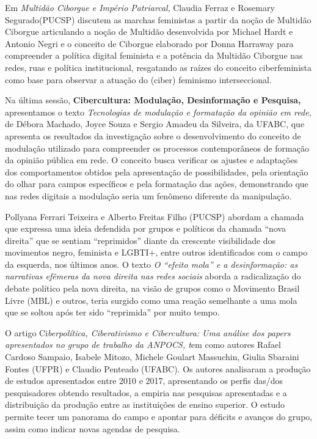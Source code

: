 Em \emph{Multidão Ciborgue e Império Patriarcal}, Claudia Ferraz e
Rosemary Segurado(PUCSP) discutem as marchas feministas a partir da
noção de Multidão Ciborgue articulando a noção de Multidão desenvolvida
por Michael Hardt e Antonio Negri e o conceito de Ciborgue elaborado por
Donna Harraway para compreender a política digital feminista e a
potência da Multidão Ciborgue nas redes, ruas e política institucional,
resgatando as raízes do conceito ciberfeminista como base para observar
a atuação do (ciber) feminismo interseccional.

Na última sessão, \textbf{Cibercultura: Modulação, Desinformação e
Pesquisa,} apresentamos o texto \emph{Tecnologias de modulação e
formatação da opinião em rede,} de Débora Machado, Joyce Souza e Sergio
Amadeu da Silveira, da UFABC, que apresenta os resultados da
investigação sobre o desenvolvimento do conceito de modulação utilizado
para compreender os processos contemporâneos de formação da opinião
pública em rede. O conceito busca verificar os ajustes e adaptações dos
comportamentos obtidos pela apresentação de possibilidades, pela
orientação do olhar para campos específicos e pela formatação das ações,
demonstrando que nas redes digitais a modulação seria um fenômeno
diferente da manipulação.

Pollyana Ferrari Teixeira e Alberto Freitas Filho (PUCSP) abordam a
chamada que expressa uma ideia defendida por grupos e políticos da
chamada ``nova direita'' que se sentiam ``reprimidos'' diante da
crescente visibilidade dos movimentos negro, feminista e LGBTI+, entre
outros identificados com o campo da esquerda, nos últimos anos. O texto
\emph{O ``efeito mola'' e a desinformação: as narrativas efêmeras da
nova direita nas redes sociais} aborda a radicalização do debate
político pela nova direita, na visão de grupos como o Movimento Brasil
Livre (MBL) e outros, teria surgido como uma reação semelhante a uma
mola que se soltou após ter sido ``reprimida'' por muito tempo.

O artigo Ci\emph{berpolítica, Ciberativismo e Cibercultura: Uma análise
dos papers apresentados no grupo de trabalho da ANPOCS, t}em como
autores Rafael Cardoso Sampaio, Isabele Mitozo, Michele Goulart
Massuchin, Giulia Sbaraini Fontes (UFPR) e Claudio Penteado (UFABC). Os
autores analisaram a produção de estudos apresentados entre 2010 e 2017,
apresentando os perfis das/dos pesquisadores obtendo resultados, a
empiria nas pesquisas apresentadas e a distribuição da produção entre as
instituições de ensino superior. O estudo permite tecer um panorama do
campo e apontar para déficits e avanços do grupo, assim como indicar
novas agendas de pesquisa.

